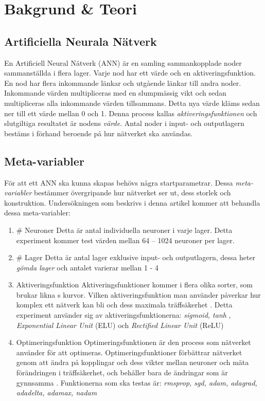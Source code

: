 \documentclass[a4paper, 11pt, twocolumn]{report}
\begin{document}
  \section{Bakgrund \& Teori}
    \subsection{Artificiella Neurala Nätverk}
    En Artificiell Neural Nätverk (ANN) är en samling sammankopplade noder sammanställda i flera lager. Varje nod har ett värde och en aktiveringsfunktion. En nod har flera inkommande länkar och utgående länkar till andra noder. Inkommande värden multipliceras med en slumpmässig vikt och sedan multipliceras alla inkommande värden tillsammans. Detta nya värde kläms sedan ner till ett värde mellan 0 och 1. Denna process kallas \textit{aktiveringsfunktionen} och slutgiltiga resultatet är nodens \textit{värde}. Antal noder i input- och outputlagern bestäms i förhand beroende på hur nätverket ska användas.

    \subsection{Meta-variabler}
    För att ett ANN ska kunna skapas behövs några startparametrar. Dessa \textit{meta-variabler} bestämmer övergripande hur nätverket ser ut, dess storlek och konstruktion. Undersökningen som beskrivs i denna artikel kommer att behandla dessa meta-variabler:
    \begin{enumerate}
      \item \# Neuroner
      Detta är antal individuella neuroner i varje lager. Detta experiment kommer test värden mellan 64 – 1024 neuroner per lager.
      \item \# Lager
      Detta är antal lager exklusive input- och outputlagern, dessa heter \textit{gömda lager} och antalet varierar mellan 1 - 4
      \item Aktiveringsfunktion
      Aktiveringsfunktioner kommer i flera olika sorter, som brukar likna s kurvor. Vilken aktiveringsfunktion man använder påverkar hur komplex ett nätverk kan bli och dess maximala träffsäkerhet \parencite{jain1996artificial}. Detta experiment använder sig av aktiveringsfunktionerna: \textit{sigmoid, tanh} \parencite{karlik2011performance}, \textit{Exponential Linear Unit} (ELU) \parencite{clevert2015fast} och \textit{Rectified Linear Unit} (ReLU) \parencite{xu2015empirical}
      \item Optimeringsfunktion
      Optimeringsfunktionen är den process som nätverket använder för att optimeras. Optimeringsfunktioner förbättrar nätverket genom att ändra på kopplingar och dess vikter mellan neuroner och mäta förändringen i träffsäkerhet, och behåller bara de ändringar som är gynnsamma \parencite{TypesofO34:online}. Funktionerna som ska testas är: \textit{rmsprop, sgd, adam, adagrad, adadelta, adamax, nadam} \parencite{kingma2014adam}
    \end{enumerate}
\end{document}
